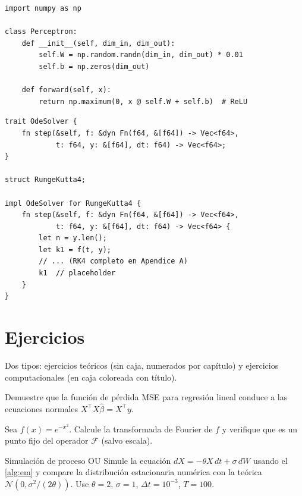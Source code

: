 \begin{lstlisting}[style=python, caption={Red neuronal mínima en Python}]
import numpy as np

class Perceptron:
    def __init__(self, dim_in, dim_out):
        self.W = np.random.randn(dim_in, dim_out) * 0.01
        self.b = np.zeros(dim_out)

    def forward(self, x):
        return np.maximum(0, x @ self.W + self.b)  # ReLU
\end{lstlisting}

\begin{lstlisting}[style=rust, caption={Trait genérico en Rust}]
trait OdeSolver {
    fn step(&self, f: &dyn Fn(f64, &[f64]) -> Vec<f64>,
            t: f64, y: &[f64], dt: f64) -> Vec<f64>;
}

struct RungeKutta4;

impl OdeSolver for RungeKutta4 {
    fn step(&self, f: &dyn Fn(f64, &[f64]) -> Vec<f64>,
            t: f64, y: &[f64], dt: f64) -> Vec<f64> {
        let n = y.len();
        let k1 = f(t, y);
        // ... (RK4 completo en Apendice A)
        k1  // placeholder
    }
}
\end{lstlisting}


\section{Ejercicios}
\label{sec:ejercicios}

Dos tipos: ejercicios teóricos (sin caja, numerados por capítulo) y
ejercicios computacionales (en caja coloreada con título).

\begin{ejercicio}
Demuestre que la función de pérdida MSE para regresión lineal conduce a las
ecuaciones normales $X^\top X \hat{\beta} = X^\top y$.
\end{ejercicio}

\begin{ejercicio}
Sea $f(x) = e^{-x^2}$. Calcule la transformada de Fourier de $f$ y
verifique que es un punto fijo del operador $\mathcal{F}$ (salvo escala).
\end{ejercicio}

\begin{ejerciciocomp}{Simulación de proceso OU}
Simule la ecuación $dX = -\theta X\,dt + \sigma\,dW$ usando el
\cref{alg:em} y compare la distribución estacionaria numérica con la
teórica $\mathcal{N}(0, \sigma^2/(2\theta))$. Use $\theta = 2$,
$\sigma = 1$, $\Delta t = 10^{-3}$, $T = 100$.
\end{ejerciciocomp}


